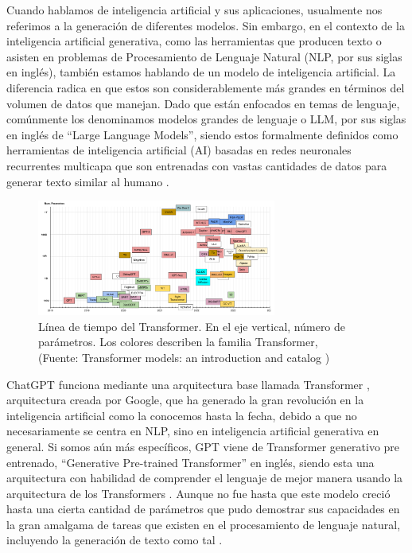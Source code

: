 \par Cuando hablamos de inteligencia artificial y sus aplicaciones, usualmente nos referimos a la generación de diferentes modelos. Sin embargo,
en el contexto de la inteligencia artificial generativa, como las herramientas que producen texto o asisten en problemas de 
Procesamiento de Lenguaje Natural (NLP, por sus siglas en inglés), también estamos hablando de un modelo de inteligencia 
artificial. La diferencia radica en que estos son considerablemente más grandes en términos del volumen de datos que manejan. 
Dado que están enfocados en temas de lenguaje, comúnmente los denominamos modelos grandes de lenguaje o LLM, por sus siglas 
en inglés de ``Large Language Models'', siendo estos formalmente definidos como herramientas de inteligencia artificial (AI) 
basadas en redes neuronales recurrentes multicapa que son entrenadas con vastas cantidades de datos para generar texto 
similar al humano \cite{mt6}.

\begin{figure}[ht!]
    \centering
    \includegraphics[width=0.7\textwidth]{figures/ea4.png}
    \caption[Línea de tiempo del Transformer]{Línea de tiempo del Transformer. En el eje vertical, número de parámetros.
    Los colores describen la familia Transformer,\\
    {\scriptsize (Fuente: Transformer models: an introduction and catalog \cite{eb4})}}

    \label{fig:ea3}
\end{figure}

\newpage

\par ChatGPT funciona mediante una arquitectura base llamada Transformer \cite{aiayn}, arquitectura creada por Google, que ha generado 
la gran revolución en la inteligencia artificial como la conocemos hasta la fecha, debido a que no necesariamente se centra en NLP, 
sino en inteligencia artificial generativa en general. Si somos aún más específicos, GPT viene de Transformer generativo 
pre entrenado, ``Generative Pre-trained Transformer'' en inglés, siendo esta una arquitectura con habilidad de comprender el 
lenguaje de mejor manera usando la arquitectura de los Transformers \cite{mt4}. Aunque no fue hasta que este modelo creció hasta una cierta cantidad de parámetros que 
pudo demostrar sus capacidades en la gran amalgama de tareas que existen en el procesamiento de lenguaje natural, incluyendo la generación de texto como tal \cite{mt5}.


